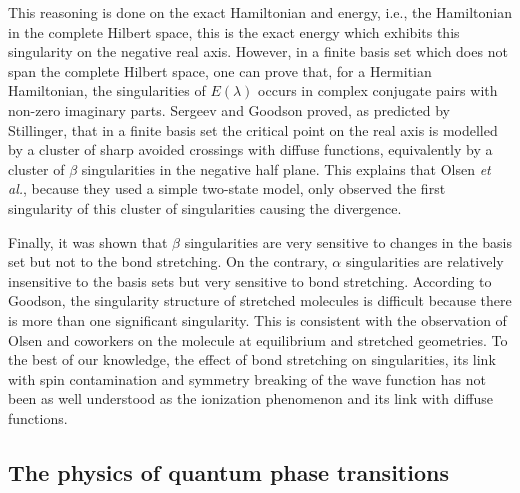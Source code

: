 \documentclass[aps,prb,reprint,noshowkeys,linenumbers,superscriptaddress]{revtex4-1}
\newcommand{\latin}[1]{#1}
\newcommand{\ie}{\latin{i.e.}}
\begin{document}
This reasoning is done on the exact Hamiltonian and energy, \ie, the Hamiltonian in the complete Hilbert space, this is the exact energy which exhibits this singularity on the negative real axis. 
However, in a finite basis set which does not span the complete Hilbert space, one can prove that, for a Hermitian Hamiltonian, the singularities of $E(\lambda)$ occurs in complex conjugate pairs with non-zero imaginary parts. 
Sergeev and Goodson proved, \cite{Sergeev_2005} as predicted by Stillinger, \cite{Stillinger_2000} that in a finite basis set the critical point on the real axis is modelled by a cluster of sharp avoided crossings with diffuse functions, equivalently by a cluster of $\beta$ singularities in the negative half plane. 
This explains that Olsen \textit{et al.}, because they used a simple two-state model, only observed the first singularity of this cluster of singularities causing the divergence. \cite{Olsen_2000}

Finally, it was shown that $\beta$ singularities are very sensitive to changes in the basis set but not to the bond stretching. 
On the contrary, $\alpha$ singularities are relatively insensitive to the basis sets but very sensitive to bond stretching. 
According to Goodson, \cite{Goodson_2004} the singularity structure of stretched molecules is difficult because there is more than one significant singularity. 
This is consistent with the observation of Olsen and coworkers \cite{Olsen_2000} on the  molecule at equilibrium and stretched geometries. 
To the best of our knowledge, the effect of bond stretching on singularities, its link with spin contamination and symmetry breaking of the wave function has not been as well understood as the ionization phenomenon and its link with diffuse functions.  

\subsection{The physics of quantum phase transitions}
\end{document}
